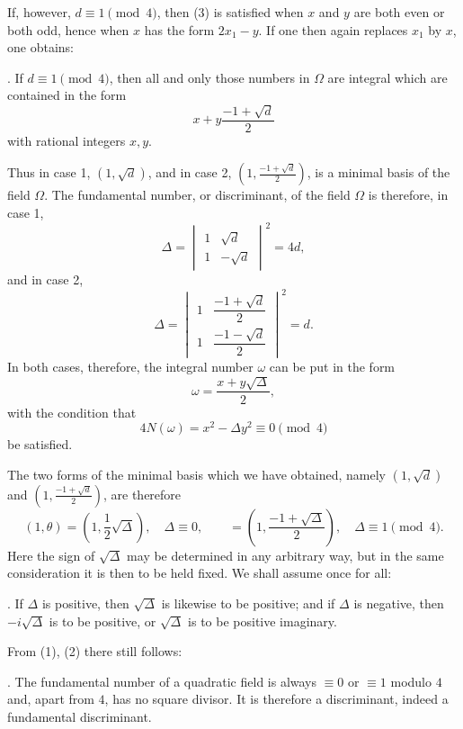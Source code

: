 \documentclass[11pt]{article}
\begin{document}
If, however, $d\equiv1\pmod4$, then (3) is satisfied when $x$ and $y$ are both even or both odd, hence when $x$ has the form $2x_1-y$. If one then again replaces $x_1$ by $x$, one obtains:

\medskip
{}. If $d\equiv1\pmod4$, then all and only those numbers in $\Omega$ are integral which are contained in the form
\[
 x+y\frac{-1+\sqrt d}{2}
\]
with rational integers $x,y$.
\medskip

Thus in case 1, $(1,\sqrt d)$, and in case 2, $\left(1,\frac{-1+\sqrt d}{2}\right)$, is a minimal basis of the field $\Omega$. The fundamental number, or discriminant, of the field $\Omega$ is therefore, in case 1,
\begin{equation}
 \Delta=\begin{vmatrix}
 1&\sqrt d\\
 1&-\sqrt d
 \end{vmatrix}^{2}=4d,
\tag{5}
\end{equation}
and in case 2,
\begin{equation}
 \Delta=\begin{vmatrix}
 1&\dfrac{-1+\sqrt d}{2}\\[0.35em]
 1&\dfrac{-1-\sqrt d}{2}
 \end{vmatrix}^{2}=d.
\tag{6}
\end{equation}
In both cases, therefore, the integral number $\omega$ can be put in the form
\begin{equation}
 \omega=\frac{x+y\sqrt\Delta}{2},
\tag{7}
\end{equation}
with the condition that
\begin{equation}
 4N(\omega)=x^2-\Delta y^2\equiv0\pmod4
\tag{8}
\end{equation}
be satisfied.

The two forms of the minimal basis which we have obtained, namely $(1,\sqrt d)$ and $\left(1,\frac{-1+\sqrt d}{2}\right)$, are therefore
\begin{equation}
 (1,\theta)=\left(1,\frac12\sqrt\Delta\right),\quad \Delta\equiv0,\qquad
 =\left(1,\frac{-1+\sqrt\Delta}{2}\right),\quad \Delta\equiv1\pmod4.
\tag{9}
\end{equation}
Here the sign of $\sqrt\Delta$ may be determined in any arbitrary way, but in the same consideration it is then to be held fixed. We shall assume once for all:

\medskip
{}. If $\Delta$ is positive, then $\sqrt\Delta$ is likewise to be positive; and if $\Delta$ is negative, then $-i\sqrt\Delta$ is to be positive, or $\sqrt\Delta$ is to be positive imaginary.
\medskip

From (1), (2) there still follows:

\medskip
{}. The fundamental number of a quadratic field is always $\equiv0$ or $\equiv1$ modulo $4$ and, apart from $4$, has no square divisor. It is therefore a discriminant, indeed a fundamental discriminant.
\end{document}
